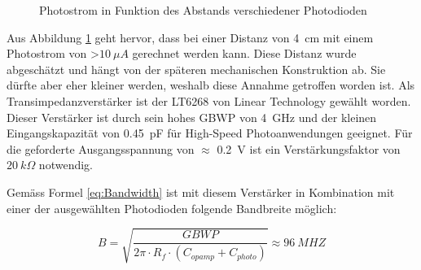 \begin{figure}[h]
\centering
{}
\caption{Photostrom in Funktion des Abstands verschiedener Photodioden}\label{fig:Plot_Photo}
\end{figure}

Aus Abbildung \ref{fig:Plot_Photo} geht hervor, dass bei einer Distanz von \SI{4}{cm} mit einem Photostrom von \textgreater $\SI{10}{\mu A}$ gerechnet werden kann. Diese Distanz wurde abgeschätzt und hängt von der späteren mechanischen Konstruktion ab. Sie dürfte aber eher kleiner werden, weshalb diese Annahme getroffen worden ist.
\newline
Als Transimpedanzverstärker ist der LT6268 von Linear Technology gewählt worden. Dieser Verstärker ist durch sein hohes GBWP von \SI{4}{GHz} und der kleinen Eingangskapazität von \SI{0.45}{pF} für High-Speed Photoanwendungen geeignet. Für die geforderte Ausgangsspannung von $\approx$ \SI{0.2}{V} ist ein Verstärkungsfaktor von $\SI{20}{k\Omega}$ notwendig.

Gemäss Formel \ref{eq:Bandwidth} ist mit diesem Verstärker in Kombination mit einer der ausgewählten Photodioden folgende Bandbreite möglich:

\begin{equation}\label{eq:Bandwidth2}
B=\sqrt{\frac{GBWP}{2\pi\cdot R_{f}\cdot (C_{opamp}+C_{photo})}}\approx \SI{96}{MHZ}
\end{equation}

